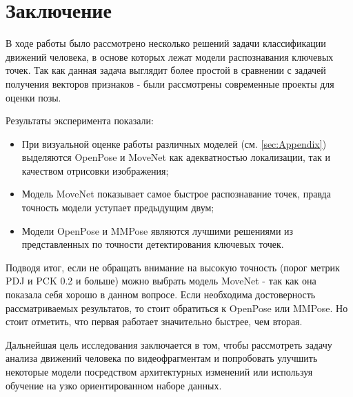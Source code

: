 \section{Заключение}
\label{sec:Chapter5} 

В ходе работы было рассмотрено несколько решений задачи классификации движений человека, в основе которых лежат модели распознавания  ключевых точек. Так как данная задача выглядит более простой в сравнении с задачей получения векторов признаков - были рассмотрены современные проекты для оценки позы.
\hspace{1cm}

Результаты эксперимента показали:
\begin{itemize}
	\item При визуальной оценке работы различных моделей (см. \autoref{sec:Appendix}) выделяются OpenPose и MoveNet как адекватностью локализации, так и качеством отрисовки изображения;
	\item Модель MoveNet показывает самое быстрое распознавание точек, правда точность модели уступает предыдущим двум;
	\item Модели OpenPose и MMPose являются лучшими решениями из представленных по точности детектирования ключевых точек.
\end{itemize} 

Подводя итог, если не обращать внимание на высокую точность (порог метрик PDJ и PCK 0.2 и больше) можно выбрать модель MoveNet - так как она показала себя хорошо в данном вопросе. Если необходима достоверность рассматриваемых результатов, то стоит обратиться к OpenPose или MMPose. Но стоит отметить, что первая работает значительно быстрее, чем вторая.

Дальнейшая цель исследования заключается в том, чтобы рассмотреть задачу анализа движений человека по видеофрагментам и попробовать улучшить некоторые модели посредством архитектурных изменений или используя обучение на узко ориентированном наборе данных.





\newpage